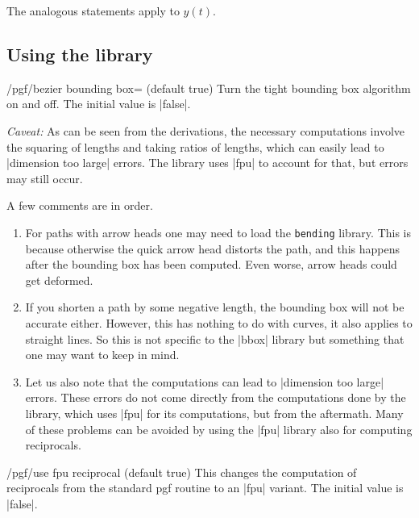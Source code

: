 The analogous statements apply to $y(t)$. 

\subsection{Using the library}

\begin{key}{/pgf/bezier bounding box= (default true)}
    Turn the tight bounding box algorithm on and off. The initial value is
	|false|.

	\emph{Caveat:} As can be seen from the derivations, the necessary
	computations involve the squaring of lengths and taking ratios of lengths,
	which can easily lead to |dimension too large| errors. The library uses
	|fpu| to account for that, but errors may still occur.
\end{key}


\begin{codeexample}[width=5cm]
\end{codeexample}

A few comments are in order. 
\begin{enumerate}
\item For paths with arrow heads one may need to load the
 \texttt{bending} library. This is because otherwise the quick arrow head
 distorts the path, and this happens after the bounding box has been computed.
 Even worse, arrow heads could get deformed.
\item If you shorten a path by some negative length, the bounding box will not
 be accurate either. However, this has nothing to do with curves, it also
 applies to straight lines. So this is not specific to the |bbox| library but
 something that one may want to keep in mind.
\item Let us also note that the computations can lead to |dimension too large| errors.
 These errors do not come directly from the computations done by the library,
 which uses |fpu| for its computations, but from the aftermath. Many of these
 problems can be avoided by using the |fpu| library also for computing
 reciprocals. 
\end{enumerate}

\begin{key}{/pgf/use fpu reciprocal (default true)}
  This changes the computation of reciprocals from the standard pgf routine to
  an |fpu| variant. The initial value is |false|.
\end{key}

\endinput


